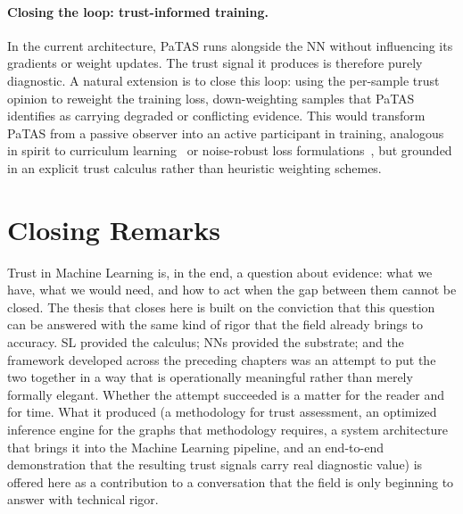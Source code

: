 
\paragraph{Closing the loop: trust-informed training.}
In the current architecture, \ac{PaTAS} runs alongside the \ac{NN} without influencing its gradients or weight updates. The trust signal it produces is therefore purely diagnostic. A natural extension is to close this loop: using the per-sample trust opinion to reweight the training loss, down-weighting samples that \ac{PaTAS} identifies as carrying degraded or conflicting evidence. This would transform  \ac{PaTAS} from a passive observer into an active participant in training, analogous in spirit to curriculum learning~\cite{soviany2022curriculumlearningsurvey} or noise-robust loss formulations~\cite{ghosh2017robustlossfunctionslabel}, but grounded in an explicit trust calculus rather than heuristic weighting schemes.


\section{Closing Remarks}
\label{sec:conclusion-closing}
Trust in Machine Learning is, in the end, a question about evidence: what we have, what we would need, and how to act when the gap between them cannot be closed. The thesis that closes here is built on the conviction that this question can be answered with the same kind of rigor that the field already brings to accuracy. \ac{SL} provided the calculus; \acp{NN} provided the substrate; and the framework developed across the preceding chapters was an attempt to put the two together in a way that is operationally meaningful rather than merely formally elegant. Whether the attempt succeeded is a matter for the reader and for time. What it produced (a methodology for trust assessment, an optimized inference engine for the graphs that methodology requires, a system architecture that brings it into the Machine Learning pipeline, and an end-to-end demonstration that the resulting trust signals carry real diagnostic value) is offered here as a contribution to a conversation that the field is only beginning to answer with technical rigor.